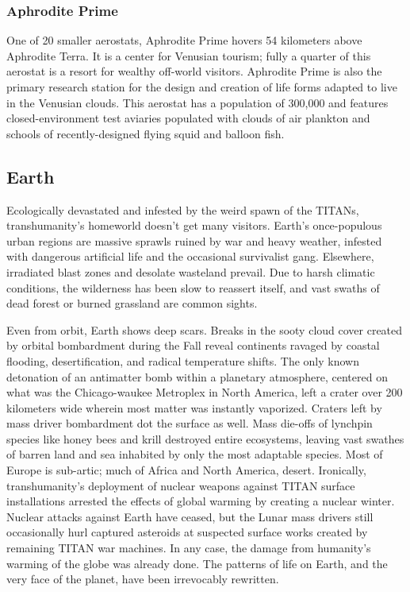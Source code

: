 \subsubsection{Aphrodite Prime}

One of 20 smaller aerostats, Aphrodite Prime hovers 
54 kilometers above Aphrodite Terra. It is a center for 
Venusian tourism; fully a quarter of this aerostat is a 
resort for wealthy off-world visitors. Aphrodite Prime 
is also the primary research station for the design and 
creation of life forms adapted to live in the Venusian 
clouds. This aerostat has  a population of 300,000 and 
features closed-environment test aviaries populated 
with clouds of air plankton and schools of recently-designed flying squid and balloon fish.

\subsection{Earth}

Ecologically devastated and infested by the weird 
spawn of the TITANs, transhumanity's homeworld 
doesn't get many visitors. Earth's once-populous 
urban regions are massive sprawls ruined by war and 
heavy weather, infested with dangerous artificial life 
and the occasional survivalist gang. Elsewhere, irradiated blast zones and desolate wasteland prevail. Due 
to harsh climatic conditions, the wilderness has been 
slow to reassert itself, and vast swaths of dead forest 
or burned grassland are common sights.

Even from orbit, Earth shows deep scars. Breaks 
in the sooty cloud cover created by orbital bombardment during the Fall reveal continents ravaged 
by coastal flooding, desertification, and radical 
temperature shifts. The only known detonation 
of an antimatter bomb within a planetary atmosphere, centered on what was the Chicago-waukee 
Metroplex in North America, left a crater over 200 
kilometers wide wherein most matter was instantly 
vaporized. Craters left by mass driver bombardment 
dot the surface as well. Mass die-offs of lynchpin 
species like honey bees and krill destroyed entire ecosystems, leaving vast swathes of barren land and sea 
inhabited by only the most adaptable species. Most 
of Europe is sub-artic; much of Africa and North 
America, desert. Ironically, transhumanity's deployment of nuclear weapons against TITAN surface 
installations arrested the effects of global warming 
by creating a nuclear winter. Nuclear attacks against 
Earth have ceased, but the Lunar mass drivers still 
occasionally hurl captured asteroids at suspected 
surface works created by remaining TITAN war 
machines. In any case, the damage from humanity's 
warming of the globe was already done. The patterns 
of life on Earth, and the very face of the planet, have 
been irrevocably rewritten.

